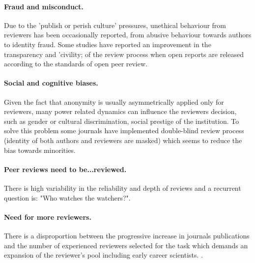 \documentclass[runningheads]{llncs}
\begin{document}
\paragraph{Fraud and misconduct.} Due to the 'publish or perish culture' pressures, unethical behaviour from reviewers has been occasionally reported, from abusive behaviour towards authors \cite{Smith2006,tragedy-reviewers} to identity fraud. Some studies have reported an improvement in the transparency and 'civility; of the review process when open reports are released according to the standards of open peer review.
\paragraph{Social and cognitive biases.} Given the fact that anonymity is usually asymmetrically applied only for reviewers, many power related dynamics can influence the reviewers decision, such as gender or cultural discrimination, social prestige of the institution. To solve this problem some journals have implemented double-blind review process (identity of both authors and reviewers are masked) which seems to reduce the bias towards minorities.
\paragraph{Peer reviews need to be...reviewed.} There is high variability in the reliability and depth of reviews and a recurrent question is: "Who watches the watchers?".
\paragraph{Need for more reviewers.} There is a disproportion between the progressive increase in journals publications and the number of experienced reviewers selected for the task which demands an expansion of the reviewer's pool including early career scientists. \cite{tragedy-reviewers}.
\end{document}
